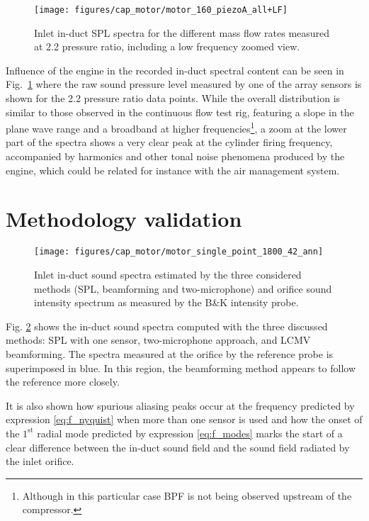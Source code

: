\begin{figure}[htb!]
\centering
\texttt{[image: figures/cap\_motor/motor\_160\_piezoA\_all+LF]}
\caption{Inlet in-duct SPL spectra for the different mass flow rates measured at 2.2 pressure ratio, including a low frequency zoomed view.}
\label{fig:motor_160_piezoA_all+LF}
\end{figure}

Influence of the engine in the recorded in-duct spectral content can be seen in Fig.~\ref{fig:motor_160_piezoA_all+LF} where the raw sound pressure level measured by one of the array sensors is shown for the 2.2 pressure ratio data points. While the overall distribution is similar to those observed in the continuous flow test rig, featuring a slope in the plane wave range and a broadband at higher frequencies\footnote{Although in this particular case BPF is not being observed upstream of the compressor.}, a zoom at the lower part of the spectra shows a very clear peak at the cylinder firing frequency, accompanied by harmonics and other tonal noise phenomena produced by the engine, which could be related for instance with the air management system.

\section{Methodology validation}
\label{sec:motor_method_valid}

\begin{figure}[b!]
\centering
\texttt{[image: figures/cap\_motor/motor\_single\_point\_1800\_42\_ann]}
\caption{Inlet in-duct sound spectra estimated by the three considered methods (SPL, beamforming and two-microphone) and orifice sound intensity spectrum as measured by the B\&K intensity probe.}
\label{fig:espectros}
\end{figure}

Fig. \ref{fig:espectros} shows the in-duct sound spectra computed with the three discussed methods: SPL with one sensor, two-microphone approach, and LCMV beamforming. The spectra measured at the orifice by the reference probe is superimposed in blue. In this region, the beamforming method appears to follow the reference more closely.

It is also shown how spurious aliasing peaks occur at the frequency predicted by expression \ref{eq:f_nyquist} when more than one sensor is used and how the onset of the ${1}^\text{st}$ radial mode predicted by expression \ref{eq:f_modes} marks the start of a clear difference between the in-duct sound field and the sound field radiated by the inlet orifice.

